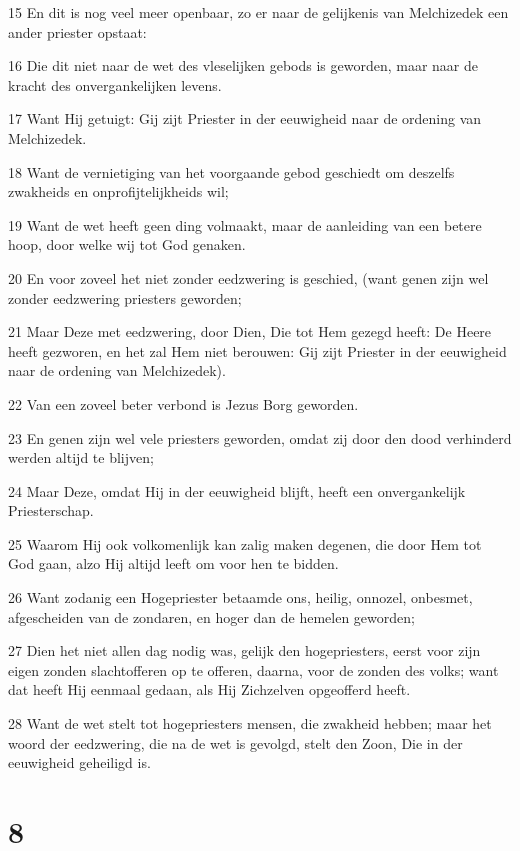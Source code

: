 \par 15 En dit is nog veel meer openbaar, zo er naar de gelijkenis van Melchizedek een ander priester opstaat:
\par 16 Die dit niet naar de wet des vleselijken gebods is geworden, maar naar de kracht des onvergankelijken levens.
\par 17 Want Hij getuigt: Gij zijt Priester in der eeuwigheid naar de ordening van Melchizedek.
\par 18 Want de vernietiging van het voorgaande gebod geschiedt om deszelfs zwakheids en onprofijtelijkheids wil;
\par 19 Want de wet heeft geen ding volmaakt, maar de aanleiding van een betere hoop, door welke wij tot God genaken.
\par 20 En voor zoveel het niet zonder eedzwering is geschied, (want genen zijn wel zonder eedzwering priesters geworden;
\par 21 Maar Deze met eedzwering, door Dien, Die tot Hem gezegd heeft: De Heere heeft gezworen, en het zal Hem niet berouwen: Gij zijt Priester in der eeuwigheid naar de ordening van Melchizedek).
\par 22 Van een zoveel beter verbond is Jezus Borg geworden.
\par 23 En genen zijn wel vele priesters geworden, omdat zij door den dood verhinderd werden altijd te blijven;
\par 24 Maar Deze, omdat Hij in der eeuwigheid blijft, heeft een onvergankelijk Priesterschap.
\par 25 Waarom Hij ook volkomenlijk kan zalig maken degenen, die door Hem tot God gaan, alzo Hij altijd leeft om voor hen te bidden.
\par 26 Want zodanig een Hogepriester betaamde ons, heilig, onnozel, onbesmet, afgescheiden van de zondaren, en hoger dan de hemelen geworden;
\par 27 Dien het niet allen dag nodig was, gelijk den hogepriesters, eerst voor zijn eigen zonden slachtofferen op te offeren, daarna, voor de zonden des volks; want dat heeft Hij eenmaal gedaan, als Hij Zichzelven opgeofferd heeft.
\par 28 Want de wet stelt tot hogepriesters mensen, die zwakheid hebben; maar het woord der eedzwering, die na de wet is gevolgd, stelt den Zoon, Die in der eeuwigheid geheiligd is.

\chapter{8}

